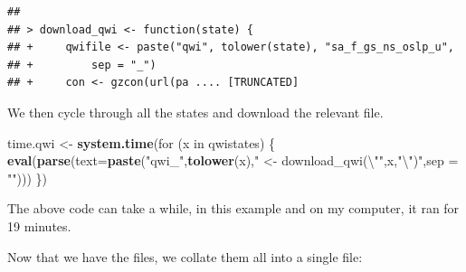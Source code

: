 \documentclass[]{article}
\newenvironment{Shaded}{\begin{snugshade}}{\end{snugshade}}
\newcommand{\KeywordTok}[1]{\textcolor[rgb]{0.13,0.29,0.53}{\textbf{{#1}}}}
\newcommand{\DataTypeTok}[1]{\textcolor[rgb]{0.13,0.29,0.53}{{#1}}}
\newcommand{\DecValTok}[1]{\textcolor[rgb]{0.00,0.00,0.81}{{#1}}}
\newcommand{\CharTok}[1]{\textcolor[rgb]{0.31,0.60,0.02}{{#1}}}
\newcommand{\StringTok}[1]{\textcolor[rgb]{0.31,0.60,0.02}{{#1}}}
\newcommand{\NormalTok}[1]{{#1}}
\begin{document}
\begin{verbatim}
## 
## > download_qwi <- function(state) {
## +     qwifile <- paste("qwi", tolower(state), "sa_f_gs_ns_oslp_u", 
## +         sep = "_")
## +     con <- gzcon(url(pa .... [TRUNCATED]
\end{verbatim}

We then cycle through all the states and download the relevant file.

\begin{Shaded}
\begin{Highlighting}[]
\NormalTok{time.qwi <-}\StringTok{ }\KeywordTok{system.time}\NormalTok{(for (x in qwistates) \{ }
  \KeywordTok{eval}\NormalTok{(}\KeywordTok{parse}\NormalTok{(}\DataTypeTok{text=}\KeywordTok{paste}\NormalTok{(}\StringTok{"qwi_"}\NormalTok{,}\KeywordTok{tolower}\NormalTok{(x),}\StringTok{" <- download_qwi(}\CharTok{\textbackslash{}"}\StringTok{"}\NormalTok{,x,}\StringTok{"}\CharTok{\textbackslash{}"}\StringTok{)"}\NormalTok{,}\DataTypeTok{sep =} \StringTok{""}\NormalTok{)))}
  \NormalTok{\})}
\end{Highlighting}
\end{Shaded}

The above code can take a while, in this example and on my computer, it
ran for 19 minutes.

Now that we have the files, we collate them all into a single file:

\begin{Shaded}
\end{Shaded}
\end{document}
